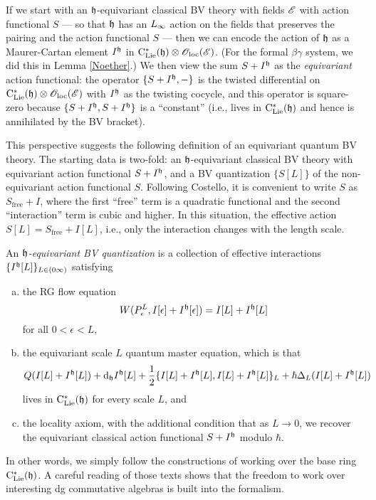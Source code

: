 \documentclass[10pt]{amsart}
\begin{document}
If we start with an $\mathfrak h$-equivariant classical BV theory with fields $\mathscr E$ with action functional $S$ --- so that $\mathfrak h$ has an $\L8$ action on the fields that preserves the pairing and the action functional $S$ --- then we can encode the action of $\mathfrak h$ as a Maurer-Cartan element $I^\mathfrak h$ in ${\rm C}_{{\rm Lie}}^*(\mathfrak h) \otimes {\mathscr O}_{\rm loc} (\mathscr E)$.
(For the formal $\beta\gamma$ system, we did this in Lemma \ref{Noether}.)
We then view the sum $S + I^\mathfrak h$ as the \emph{equivariant} action functional:
the operator $\{S+ I^\mathfrak h,-\}$ is the twisted differential on ${\rm C}_{{\rm Lie}}^*(\mathfrak h) \otimes {\mathscr O}_{\rm loc}(\mathscr E)$ with $I^\mathfrak h$ as the twisting cocycle,
and this operator is square-zero because $\{S + I^\mathfrak h, S+ I^\mathfrak h\}$ is a ``constant'' (i.e., lives in ${\rm C}_{{\rm Lie}}^*(\mathfrak h)$ and hence is annihilated by the BV bracket).

This perspective suggests the following definition of an equivariant quantum BV theory.
The starting data is two-fold:
an $\mathfrak h$-equivariant classical BV theory with equivariant action functional $S+I^\mathfrak h$, 
and a BV quantization $\{S[L]\}$ of the non-equivariant action functional $S$.
Following Costello, it is convenient to write $S$ as $S_{\text{free}} + I$, 
where the first ``free'' term is a quadratic functional and the second ``interaction'' term is cubic and higher.
In this situation, the effective action $S[L] = S_{\text{free}} + I[L]$, 
i.e., only the interaction changes with the length scale.

\begin{dfn} \label{eqQFT} 
An {\em $\mathfrak h$-equivariant BV quantization} is a collection of effective interactions $\{I^\mathfrak h[L]\}_{L \in (0\infty)}$
satisfying
\begin{enumerate}[(a)]
\item the RG flow equation
\[
W(P_\epsilon^L, I[\epsilon]+I^\mathfrak h[\epsilon]) = I[L] + I^\mathfrak h[L]
\]
for all $0 < \epsilon < L$,
\item the equivariant scale $L$ quantum master equation, which is that
\[
Q(I[L]+I^\mathfrak h[L]) + {\rm d}_\mathfrak h I^\mathfrak h[L] + \frac{1}{2}\{I[L]+I^\mathfrak h[L],I[L]+I^\mathfrak h[L]\}_{L} + \hbar \Delta_L(I[L]+I^\mathfrak h[L])
\]
lives in ${\rm C}_{{\rm Lie}}^*(\mathfrak h)$ for every scale $L$, and
\item the locality axiom, with the additional condition that as $L \to 0$, we recover the equivariant classical action functional $S+ I^\mathfrak h$ modulo $\hbar$.
\end{enumerate}
\end{dfn}

In other words, we simply follow the constructions of \cite{CosRenormalization} working over the base ring ${\rm C}_{{\rm Lie}}^*(\mathfrak h)$.
A careful reading of those texts shows that the freedom to work over interesting dg commutative algebras is built into the formalism.
\end{document}
